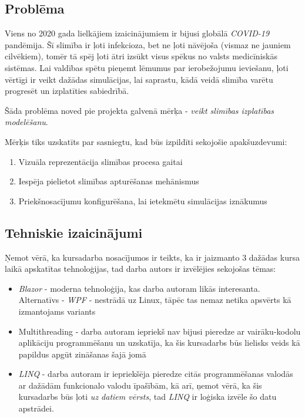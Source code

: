 
\subsection{Problēma}

Viens no 2020 gada lielkājiem izaicinājumiem ir bijusi globālā \emph{COVID-19} pandēmija.
Šī slimība ir ļoti infekcioza, bet ne ļoti nāvējoša (vismaz ne jauniem cilvēkiem), tomēr
tā spēj ļoti ātri izsūkt visus spēkus no valsts medicīniskās sistēmas. Lai valdības spētu
pieņemt lēmumus par ierobežojumu ieviešanu, ļoti vērtīgi ir veikt dažādas simulācijas,
lai saprastu, kādā veidā slimība varētu progresēt un izplatīties sabiedrībā.

Šāda problēma noved pie projekta galvenā mērķa - \emph{veikt slimības izplatības modelēšanu}.

Mērķis tiks uzskatīts par sasniegtu, kad būs izpildīti sekojošie apakšuzdevumi:

\begin{enumerate}
    \item Vizuāla reprezentācija slimības procesa gaitai
    \item Iespēja pielietot slimības apturēšanas mehānismus
    \item Priekšnosacījumu konfigurēšana, lai ietekmētu simulācijas iznākumus
\end{enumerate}

\subsection{Tehniskie izaicinājumi}

Ņemot vērā, ka kursadarba nosacījumos ir teikts, ka ir jaizmanto 3 dažādas kursa
laikā apskatītas tehnoloģijas, tad darba autors ir izvēlējies sekojošas tēmas:

\begin{itemize}
    \item \emph{Blazor} - moderna tehnoloģija, kas darba autoram likās interesanta.
        Alternatīvs - \emph{WPF} - nestrādā uz Linux, tāpēc tas nemaz netika apsvērts kā izmantojams variants
    \item Multithreading - darba autoram iepriekš nav bijusi pieredze ar vairāku-kodolu
        aplikāciju programmēšanu un uzskatīja, ka šis kursadarbs būs lielisks veids kā papildus apgūt zināšanas šajā jomā
    \item \emph{LINQ} - darba autoram ir iepriekšēja pieredze citās programmēšanas
        valodās ar dažādām funkcionalo valodu īpašībām, kā arī, ņemot vērā, ka šis
        kursadarbs būs ļoti \emph{uz datiem vērsts}, tad \emph{LINQ} ir loģiska izvēle šo datu apstrādei.
\end{itemize}
